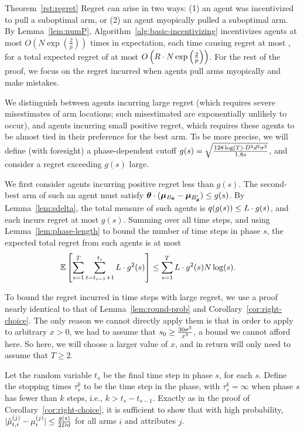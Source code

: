 \begin{extraproof}{Theorem~\ref{rst:regret}}
Regret can arise in two ways:
(1) an agent was incentivized to pull a suboptimal arm, or
(2) an agent myopically pulled a suboptimal arm.
By Lemma~\ref{lem:numP}, Algorithm~\ref{alg:basic-incentivizing}
incentivizes agents at most 
$O\left( N\exp\left(\frac{2}{p}\right) \right)$
times in expectation, each time causing regret at most \MAXR,
for a total expected regret of at most
$O\left(R\cdot N\exp\left(\frac{2}{p}\right) \right)$.
For the rest of the proof, we focus on the regret incurred when agents
pull arms myopically and make mistakes.

We distinguish between agents incurring large regret
(which requires severe misestimates of arm locations;
such misestimated are exponentially unlikely to occur), 
and agents incurring small positive regret,
which requires these agents to be almost tied in their preference for
the best arm.
To be more precise, we will define (with foresight) a phase-dependent
cutoff
$g(s) = \sqrt{\frac{128\log(T) \cdot D^2 d^2 \sigma^2}{1.8 s}}$,
and consider a regret exceeding $g(s)$ large.

We first consider agents \AgV incurring positive regret less than $g(s)$.
The second-best arm \Second{\AgV} of such an agent \AgV must satisfy
$\bm{\theta} \cdot (\bm{\mu}_{B_{\bm{\theta}}} - \bm{\mu}_{B'_{\bm{\theta}}}) \leq g(s)$.
By Lemma~\ref{lem:sdelta}, the total measure of such agents
is $q(g(s)) \leq L \cdot g(s)$,
and each incurs regret at most $g(s)$.
Summing over all time steps,
and using Lemma~\ref{lem:phase-length} to bound the number of time
steps in phase $s$, 
the expected total regret from such agents is at most
\begin{align}
\Expect{\sum_{s=1}^{T} \sum_{t=t_{s-1}+1}^{t_{s}} \TieDensity \cdot g^2(s)}
& \leq \sum_{s=1}^{T} \TieDensity \cdot g^2(s) \ARMNUM \log(s).
\label{equ:small_regret_bound}
\end{align}

To bound the regret incurred in time steps with large regret,
we use a proof nearly identical to that of
Lemma~\ref{lem:round-prob} and Corollary~\ref{cor:right-choice}.
The only reason we cannot directly apply them is that in order
to apply to arbitrary $x > 0$, we had to assume that
$s_0 \geq \frac{30 \sigma^3}{x^3}$, a bound we cannot afford here.
So here, we will choose a larger value of $x$, and in return
will only need to assume that $T \geq 2$.

Let the random variable $t_s$ be the final time step in phase $s$,
for each $s$. Define the stopping times $\tau_{s}^{k}$ to be the 
time step in the  phase,
with $\tau_{s}^{k} = \infty$ when phase $s$ has fewer than $k$ steps,
i.e., $k > t_{s}-t_{s-1}$.
Exactly as in the proof of Corollary~\ref{cor:right-choice},
it is sufficient to show that with high probability,
$|\hat{\mu}_{t,i}^{(j)} - \mu_{i}^{(j)}| \leq \frac{g(s)}{2D d}$
for all arms $i$ and attributes $j$.


\end{extraproof}
